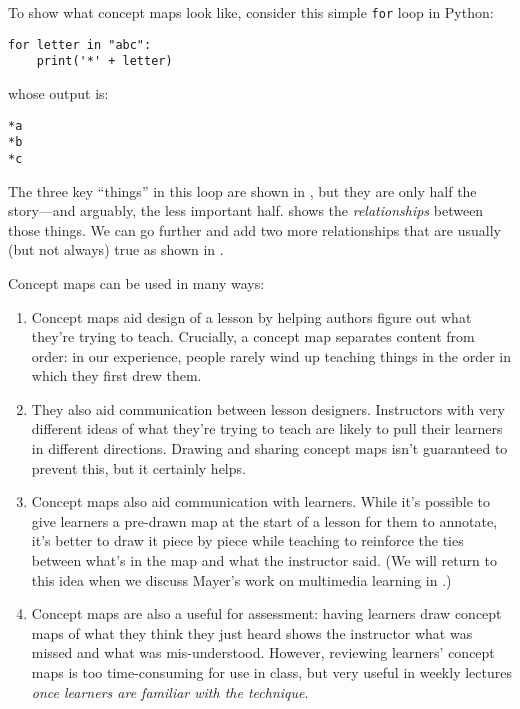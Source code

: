 To show what concept maps look like, consider this simple \texttt{for}
loop in Python:

\begin{verbatim}
for letter in "abc":
    print('*' + letter)
\end{verbatim}

\noindent
whose output is:

\begin{verbatim}
*a
*b
*c
\end{verbatim}

\noindent
The three key ``things'' in this loop are shown in
,  but they are only half the
story---and arguably, the less important half.
 shows the \emph{relationships} between
those things.  We can go further and add two more relationships that are
usually (but not always) true as shown in
.

Concept maps can be used in many ways:

\begin{enumerate}

\item
  Concept maps aid design of a lesson by helping authors figure out
  what they're trying to teach. Crucially, a concept map separates
  content from order: in our experience, people rarely wind up
  teaching things in the order in which they first drew them.

\item
  They also aid communication between lesson designers. Instructors
  with very different ideas of what they're trying to teach are likely
  to pull their learners in different directions. Drawing and sharing
  concept maps isn't guaranteed to prevent this, but it certainly
  helps.

\item
  Concept maps also aid communication with learners. While it's
  possible to give learners a pre-drawn map at the start of a lesson
  for them to annotate, it's better to draw it piece by piece while
  teaching to reinforce the ties between what's in the map and what
  the instructor said. (We will return to this idea when we discuss
  Mayer's work on multimedia learning in .)

\item
  Concept maps are also a useful for assessment: having learners draw
  concept maps of what they think they just heard shows the instructor
  what was missed and what was mis-understood.  However, reviewing
  learners' concept maps is too time-consuming for use in class, but
  very useful in weekly lectures \emph{once learners are familiar with
  the technique}. 

\end{enumerate}

